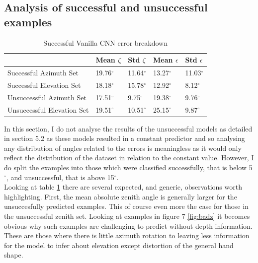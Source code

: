 \documentclass{article}
\begin{document}
\subsection{Analysis of successful and unsuccessful examples}
\begin{table}[h!]
  \begin{center}
    \caption{Successful Vanilla CNN error breakdown}
    \label{tab:tablebreakdown}
    \begin{tabular}{l|l|l|l|l}
      \textbf{} & \textbf{Mean $\zeta$} &  \textbf{Std $\zeta$} & \textbf{Mean $\epsilon$} &  \textbf{Std $\epsilon$}  \\
      \hline
      Successful Azimuth Set & 19.76$^{\circ}$ & 11.64$^{\circ}$& 13.27$^{\circ}$ & 11.03$^{\circ}$ \\
      Successful Elevation Set & 18.18$^{\circ}$  & 15.78$^{\circ}$ & 12.92$^{\circ}$ & 8.12$^{\circ}$\\
      Unsuccessful Azimuth Set & 17.51$^{\circ}$ & 9.75$^{\circ}$ & 19.38$^{\circ}$ & 9.76$^{\circ}$\\
      Unsuccessful Elevation Set & 19.51$^{\circ}$  & 10.51$^{\circ}$& 25.15$^{\circ}$ & 9.87$^{\circ}$\\
    \end{tabular}
  \end{center}
\end{table}

In this section, I do not analyse the results of the unsuccessful models as detailed in section 5.2 as these models resulted in a constant predictor and so analysing any distribution of angles related to the errors is meaningless as it would only reflect the distribution of the dataset in relation to the constant value. However, I do split the examples into those which were classified successfully, that is below 5 $^{\circ}$, and unsuccessful, that is above 15$^{\circ}$. \\

Looking at table \ref{tab:tablebreakdown} there are several expected, and generic, observations worth highlighting. First, the mean absolute zenith angle is generally larger for the unsuccesfully predicted examples. This of course even more the case for those in the unsuccessful zenith set. Looking at examples in figure 7 \ref{fig:badz} it becomes obvious why such examples are challenging to predict without depth information. These are those where there is little azimuth rotation to leaving less information for the model to infer about elevation except distortion of the general hand shape. \\
\end{document}
